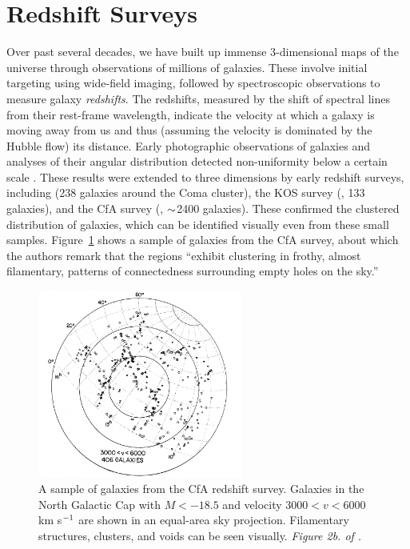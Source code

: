 \section{Redshift Surveys}

Over past several decades, we have built up immense 3-dimensional maps of the universe through observations of millions of galaxies.
These involve initial targeting using wide-field imaging, followed by spectroscopic observations to measure galaxy \emph{redshifts}.
The redshifts, measured by the shift of spectral lines from their rest-frame wavelength, indicate the velocity at which a galaxy is moving away from us and thus (assuming the velocity is dominated by the Hubble flow) its distance.
Early photographic observations of galaxies and  analyses of their angular distribution detected non-uniformity below a certain scale \citep{shapley_survey_1932,hubble_distribution_1934,seldner_new_1977,peebles_galaxy_2001}.
These results were extended to three dimensions by early redshift surveys, including \cite{gregory_comaa1367_1978} (238 galaxies around the Coma cluster), the KOS survey (\citealt{kirshner_million_1981}, 133 galaxies), and the CfA survey (\citealt{davis_survey_1982}, $\mathord{\sim}$2400 galaxies).
These confirmed the clustered distribution of galaxies, which can be identified visually even from these small samples. 
Figure~\ref{fig:cfa_survey} shows a sample of galaxies from the CfA survey, about which the authors remark that the regions ``exhibit clustering in frothy, almost filamentary, patterns of connectedness surrounding empty holes on the sky.''

\begin{figure}
    \centering
    \includegraphics[width=0.6\textwidth]{cfa_survey}
    \caption{A sample of galaxies from the CfA redshift survey. Galaxies in the North Galactic Cap with $M<-18.5$ and velocity $3000<v<6000$ km s$^{-1}$ are shown in an equal-area sky projection. Filamentary structures, clusters, and voids can be seen visually. \emph{Figure 2b. of \cite{davis_survey_1982}.}}
    \label{fig:cfa_survey}
\end{figure}


